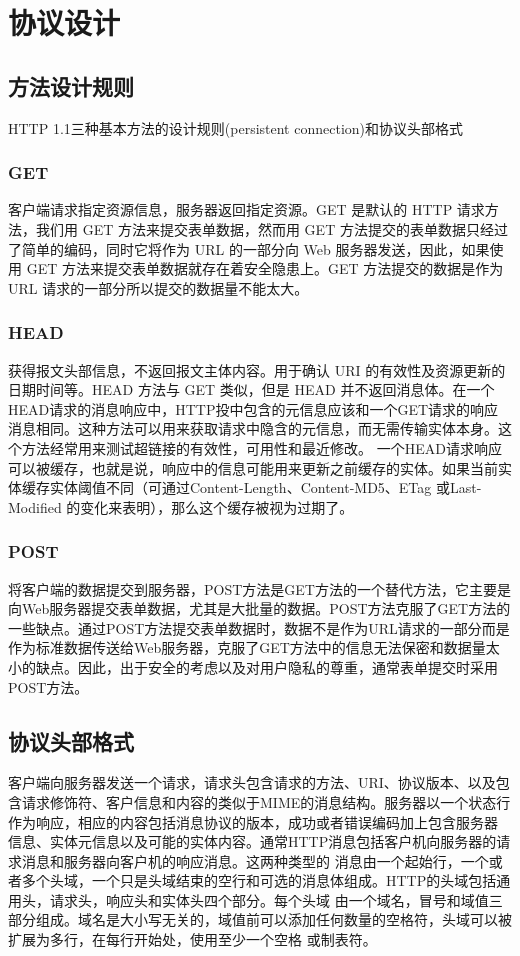 \chapter{协议设计}

\section{方法设计规则}
HTTP 1.1三种基本方法的设计规则(persistent connection)和协议头部格式
\subsection*{GET}
客户端请求指定资源信息，服务器返回指定资源。GET 是默认的 HTTP 请求方法，我们用 GET 方法来提交表单数据，然而用 GET 方法提交的表单数据只经过了简单的编码，同时它将作为 URL 的一部分向 Web 服务器发送，因此，如果使用 GET 方法来提交表单数据就存在着安全隐患上。GET 方法提交的数据是作为 URL 请求的一部分所以提交的数据量不能太大。

\subsection*{HEAD}
获得报文头部信息，不返回报文主体内容。用于确认 URI 的有效性及资源更新的日期时间等。HEAD 方法与 GET 类似，但是 HEAD 并不返回消息体。在一个HEAD请求的消息响应中，HTTP投中包含的元信息应该和一个GET请求的响应消息相同。这种方法可以用来获取请求中隐含的元信息，而无需传输实体本身。这个方法经常用来测试超链接的有效性，可用性和最近修改。 一个HEAD请求响应可以被缓存，也就是说，响应中的信息可能用来更新之前缓存的实体。如果当前实体缓存实体阈值不同（可通过Content-Length、Content-MD5、ETag 或Last-Modified 的变化来表明），那么这个缓存被视为过期了。

\subsection*{POST}
将客户端的数据提交到服务器，POST方法是GET方法的一个替代方法，它主要是向Web服务器提交表单数据，尤其是大批量的数据。POST方法克服了GET方法的一些缺点。通过POST方法提交表单数据时，数据不是作为URL请求的一部分而是作为标准数据传送给Web服务器，克服了GET方法中的信息无法保密和数据量太小的缺点。因此，出于安全的考虑以及对用户隐私的尊重，通常表单提交时采用POST方法。


\section{协议头部格式}
客户端向服务器发送一个请求，请求头包含请求的方法、URI、协议版本、以及包 含请求修饰符、客户信息和内容的类似于MIME的消息结构。服务器以一个状态行作为响应，相应的内容包括消息协议的版本，成功或者错误编码加上包含服务器 信息、实体元信息以及可能的实体内容。通常HTTP消息包括客户机向服务器的请求消息和服务器向客户机的响应消息。这两种类型的 消息由一个起始行，一个或者多个头域，一个只是头域结束的空行和可选的消息体组成。HTTP的头域包括通用头，请求头，响应头和实体头四个部分。每个头域 由一个域名，冒号和域值三部分组成。域名是大小写无关的，域值前可以添加任何数量的空格符，头域可以被扩展为多行，在每行开始处，使用至少一个空格 或制表符。

